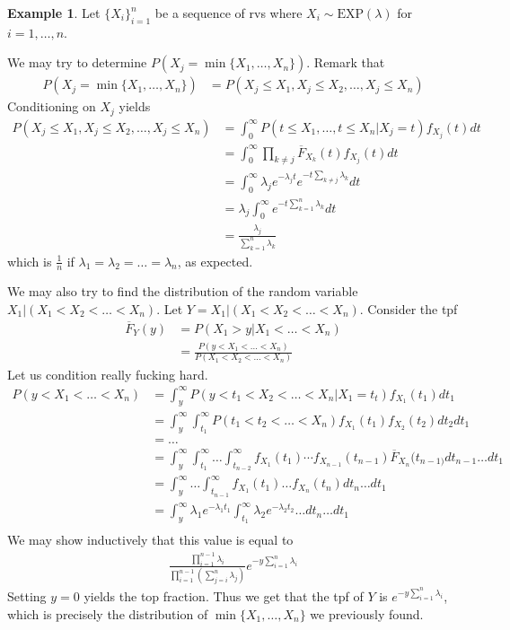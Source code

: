 \documentclass[11pt]{amsart}
\theoremstyle{definition}
\newtheorem{example}[theorem]{Example}
\numberwithin{equation}{section}
\begin{document}
 \begin{example}
     Let $\{X_i\}_{i=1}^n$ be a sequence of rvs where $X_i\sim\mathrm{EXP}(\lambda)$ for $i=1,\ldots,n$. 
     
     We may try to determine $P(X_j=\min\{X_1,\ldots,X_n\})$. Remark that 
     \begin{align*}
         P(X_j=\min\{X_1,\ldots,X_n\})&=P(X_j\le X_1,X_j\le X_2,\ldots, X_j\le X_n)
     \end{align*}
     Conditioning on $X_j$ yields
     \begin{align*}
         P(X_j\le X_1,X_j\le X_2,\ldots, X_j\le X_n)&=\int_{0}^\infty P(t\le X_1,\ldots, t\le X_n|X_j=t)f_{X_j}(t)dt\\
         &=\int_0^\infty \prod_{k\ne j}\overline{F}_{X_k}(t)f_{X_j}(t)dt\\
         &=\int_0^\infty \lambda_je^{-\lambda_jt}e^{-t\sum_{k\ne j}\lambda_k}dt\\
         &=\lambda_j\int_0^\infty e^{-t\sum_{k=1}^n\lambda_k}dt\\
         &=\frac{\lambda_j}{\sum_{k=1}^n\lambda_k}
     \end{align*}
     which is $\frac{1}{n}$ if $\lambda_1=\lambda_2=\ldots=\lambda_n$, as expected.

     We may also try to find the distribution of the random variable $X_1|(X_1<X_2<\ldots<X_n)$. Let $Y=X_1|(X_1<X_2<\ldots<X_n)$. Consider the tpf
     \begin{align*}
         \overline{F}_Y(y)&=P(X_1>y|X_1<\ldots<X_n)\\
         &=\frac{P(y<X_1<\ldots<X_n)}{P(X_1<X_2<\ldots<X_n)}
     \end{align*}
     Let us condition really fucking hard.
     \begin{align*}
         P(y<X_1<\ldots<X_n)&=\int_{y}^\infty P(y<t_1<X_2<\ldots<X_n|X_1=t_t)f_{X_1}(t_1)dt_1\\
         &=\int_{y}^\infty\int_{t_1}^\infty P(t_1<t_2<\ldots<X_n)f_{X_1}(t_1)f_{X_2}(t_2)dt_2dt_1\\
         &=\ldots\\
         &=\int_{y}^\infty \int_{t_1}^\infty \ldots \int_{t_{n-2}}^\infty f_{X_1}(t_1)\cdots f_{X_{n-1}}(t_{n-1})\overline{F}_{X_n}(t_{n-1)}dt_{n-1}\ldots dt_1\\
         &=\int_y^\infty \ldots\int_{t_{n-1}}^\infty f_{X_1}(t_1)\ldots f_{X_n}(t_n)dt_{n}\ldots dt_1\\
         &=\int_y^\infty \lambda_1e^{-\lambda_1t_1}\int_{t_1}^\infty \lambda_2e^{-\lambda_2 t_2}\ldots dt_{n}\ldots dt_1\\
     \end{align*}
     We may show inductively that this value is equal to
     \begin{align*}
         \frac{\prod_{i=1}^{n-1}\lambda_i}{\prod_{i=1}^{n-1}(\sum_{j=i}^n\lambda_j)}e^{-y\sum_{i=1}^n\lambda_i}
     \end{align*}
     Setting $y=0$ yields the top fraction. Thus we get that the tpf of $Y$ is $e^{-y\sum_{i=1}^n\lambda_i}$, which is precisely the distribution of $\min\{X_1,\ldots,X_n\}$ we previously found.
 \end{example}
\end{document}
